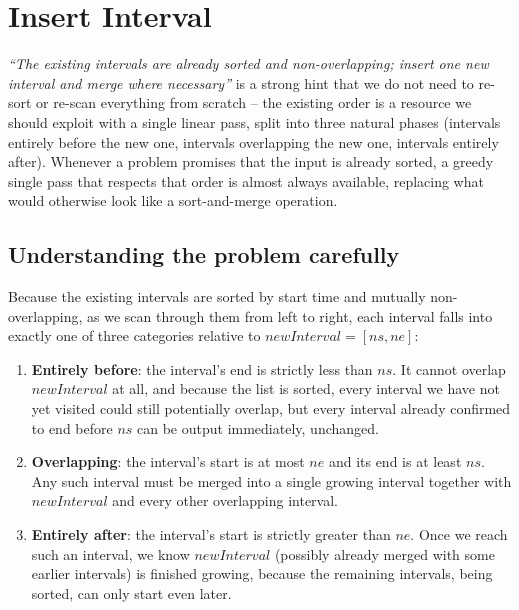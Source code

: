\section{Insert Interval}
\label{sec:insert-interval}


\begin{patternbox}
\emph{``The existing intervals are already sorted and non-overlapping; insert
one new interval and merge where necessary''} is a strong hint that we do
not need to re-sort or re-scan everything from scratch -- the existing order
is a resource we should exploit with a single linear pass, split into three
natural phases (intervals entirely before the new one, intervals overlapping
the new one, intervals entirely after). Whenever a problem promises that the
input is already sorted, a greedy single pass that respects that order is
almost always available, replacing what would otherwise look like a
sort-and-merge operation.
\end{patternbox}

\subsection*{Understanding the problem carefully}

Because the existing intervals are sorted by start time and mutually
non-overlapping, as we scan through them from left to right, each interval
falls into exactly one of three categories relative to
$\textit{newInterval} = [\textit{ns}, \textit{ne}]$:

\begin{enumerate}
  \item \textbf{Entirely before}: the interval's end is strictly less than
        $\textit{ns}$. It cannot overlap $\textit{newInterval}$ at all, and
        because the list is sorted, every interval we have not yet visited
        could still potentially overlap, but every interval already
        confirmed to end before $\textit{ns}$ can be output immediately,
        unchanged.
  \item \textbf{Overlapping}: the interval's start is at most
        $\textit{ne}$ and its end is at least $\textit{ns}$. Any such
        interval must be merged into a single growing interval together
        with $\textit{newInterval}$ and every other overlapping interval.
  \item \textbf{Entirely after}: the interval's start is strictly greater
        than $\textit{ne}$. Once we reach such an interval, we know
        $\textit{newInterval}$ (possibly already merged with some earlier
        intervals) is finished growing, because the remaining intervals,
        being sorted, can only start even later.
\end{enumerate}

